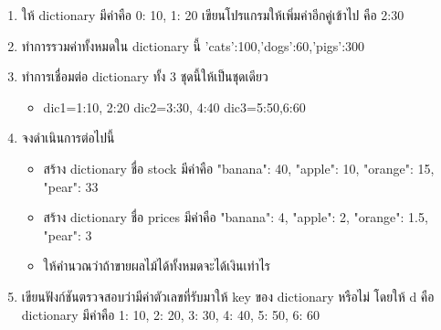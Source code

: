 \begin{enumerate} 
\item ให้ dictionary มีค่าคือ {0: 10, 1: 20} เขียนโปรแกรมให้เพิ่มค่าอีกคู่เข้าไป คือ 2:30
\item ทำการรวมค่าทั้งหมดใน dictionary นี้ {'cats':100,'dogs':60,'pigs':300}
\item ทำการเชื่อมต่อ dictionary ทั้ง 3 ชุดนี้ให้เป็นชุดเดียว
	\begin{itemize}
		\item dic1={1:10, 2:20} dic2={3:30, 4:40} dic3={5:50,6:60} 
	\end{itemize}
\item จงดำเนินการต่อไปนี้
	\begin{itemize}
		\item สร้าง dictionary ชื่อ stock มีค่าคือ "banana": 40, "apple": 10, "orange": 15, "pear": 33
		\item สร้าง dictionary ชื่อ prices มีค่าคือ "banana": 4, "apple": 2, "orange": 1.5, "pear": 3
		\item ให้คำนวณว่าถ้าขายผลไม้ได้ทั้งหมดจะได้เงินเท่าไร
	\end{itemize}
\item เขียนฟังก์ชันตรวจสอบว่ามีค่าตัวเลขที่รับมาให้ key ของ dictionary หรือไม่ โดยให้ d คือ dictionary มีค่าคือ {1: 10, 2: 20, 3: 30, 4: 40, 5: 50, 6: 60}

\end{enumerate}
